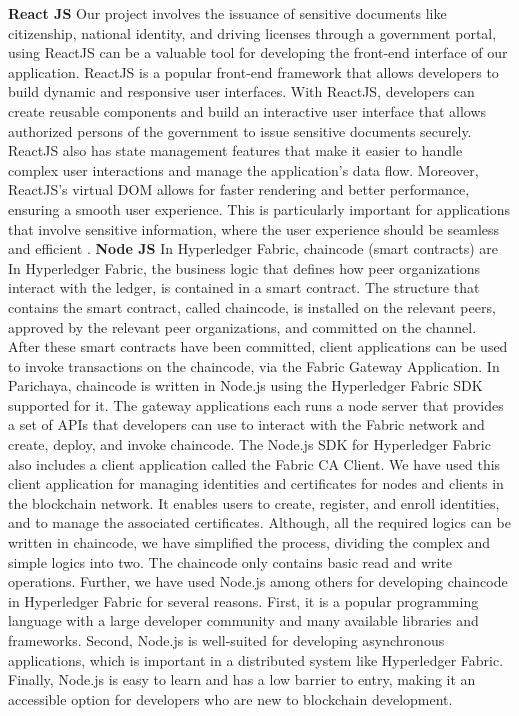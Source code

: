 
    \textbf{React JS}\newline
   Our project involves the issuance of sensitive documents like citizenship, national identity, and driving licenses through a government portal, using ReactJS can be a valuable tool for developing the front-end interface of our application. ReactJS is a popular front-end framework that allows developers to build dynamic and responsive user interfaces. With ReactJS, developers can create reusable components and build an interactive user interface that allows authorized persons of the government to issue sensitive documents securely. ReactJS also has state management features that make it easier to handle complex user interactions and manage the application's data flow.
   Moreover, ReactJS's virtual DOM allows for faster rendering and better performance, ensuring a smooth user experience. This is particularly important for applications that involve sensitive information, where the user experience should be seamless and efficient \cite{aggarwal2018modern}.
 \newpage
 \textbf{Node JS}\newline
 In Hyperledger Fabric, chaincode (smart contracts) are In Hyperledger Fabric, the business logic that defines how peer organizations interact with the ledger, is contained in a smart contract. The structure that contains the smart contract, called chaincode, is installed on the relevant peers, approved by the relevant peer organizations, and committed on the channel. After these smart contracts have been committed, client applications can be used to invoke transactions on the chaincode, via the Fabric Gateway Application. In Parichaya, chaincode is written in Node.js using the Hyperledger Fabric SDK supported for it. The gateway applications each runs a node server that provides a set of APIs that developers can use to interact with the Fabric network and create, deploy, and invoke chaincode. 
The Node.js SDK for Hyperledger Fabric also includes a client application called the Fabric CA Client. We have used this client application for managing identities and certificates for nodes and clients in the blockchain network. It enables users to create, register, and enroll identities, and to manage the associated certificates. Although, all the required logics can be written in chaincode, we  have simplified the process, dividing the complex and simple logics into two. The chaincode only contains basic read and write operations. Further, we have used Node.js among others for developing chaincode in Hyperledger Fabric for several reasons. First, it is a popular programming language with a large developer community and many available libraries and frameworks. Second, Node.js is well-suited for developing asynchronous applications, which is important in a distributed system like Hyperledger Fabric. Finally, Node.js is easy to learn and has a low barrier to entry, making it an accessible option for developers who are new to blockchain development.
